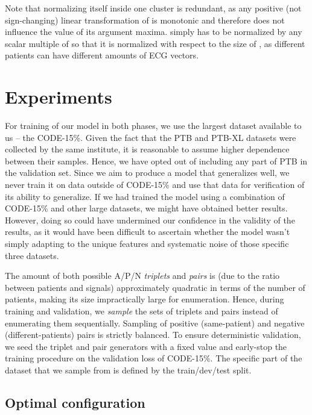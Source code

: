 \documentclass[preprint,12pt]{elsarticle}
\begin{document}
Note that normalizing  itself inside one cluster is redundant, as any positive (not sign-changing) linear transformation of  is monotonic and therefore does not influence the value of its argument maxima.  simply has to be normalized by any scalar multiple of  so that it is normalized with respect to the size of , as different patients can have different amounts of ECG vectors.



\section{Experiments}

For training of our model in both phases, we use the largest dataset available to us -- the CODE-15\%. Given the fact that the PTB and PTB-XL datasets were collected by the same institute, it is reasonable to assume higher dependence between their samples. Hence, we have opted out of including any part of PTB in the validation set. Since we aim to produce a model that generalizes well, we never train it on data outside of CODE-15\% and use that data for verification of its ability to generalize. If we had trained the model using a combination of CODE-15\% and other large datasets, we might have obtained better results. However, doing so could have undermined our confidence in the validity of the results, as it would have been difficult to ascertain whether the model wasn't simply adapting to the unique features and systematic noise of those specific three datasets.



The amount of both possible A/P/N \textit{triplets} and \textit{pairs} is (due to the ratio between patients and signals) approximately quadratic in terms of the number of patients, making its size impractically large for enumeration. Hence, during training and validation, we \textit{sample} the sets of triplets and pairs instead of enumerating them sequentially. Sampling of positive (same-patient) and negative (different-patients) pairs is strictly balanced. To ensure deterministic validation, we seed the triplet and pair generators with a fixed value and early-stop the training procedure on the validation loss of CODE-15\%. The specific part of the dataset that we sample from is defined by the train/dev/test split.



\subsection{Optimal configuration}
\end{document}
